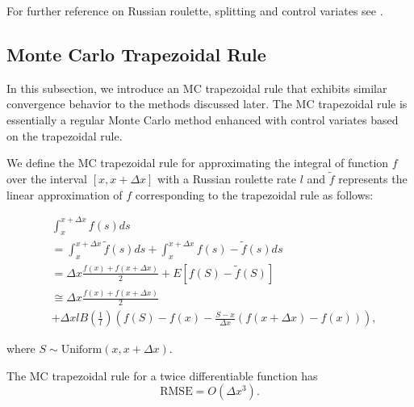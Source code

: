 \documentclass[a4paper,12pt]{article}
\begin{document}
\begin{related}[MC modification]
    For further reference on Russian roulette, splitting and control variates
    see \cite{veach_robust_1997}.
\end{related}

\subsection{Monte Carlo Trapezoidal Rule}

In this subsection, we introduce an MC trapezoidal rule that
exhibits similar convergence behavior to the methods discussed later.
The MC trapezoidal rule is essentially a regular Monte Carlo method
enhanced with control variates based on the trapezoidal rule.

\begin{definition}
    We define the MC trapezoidal rule for approximating the integral
    of function $f$ over the interval $[x, x+\Delta x]$ with a Russian roulette rate
    $l$ and $\tilde{f}$ represents the linear approximation of $f$ corresponding
    to the trapezoidal rule as follows:

    \begin{align}
         & \int_{x}^{x+\Delta x} f(s) ds                           \\
         & = \int_{x}^{x+\Delta x}  \tilde{f}(s) ds +
        \int_{x}^{x+\Delta x}  f(s) - \tilde{f}(s) ds              \\
         & = \Delta x \frac{f(x) + f(x+\Delta x)}{2}
        + E \left[f(S) - \tilde{f}(S)\right]                       \\
         & \cong \Delta x \frac{f(x) + f(x+\Delta x)}{2} \nonumber \\
         & + \Delta x l B\left( \frac{1}{l}\right)
        \left(f(S) - f(x) - \frac{S - x}{\Delta x}
        \left(f(x+\Delta x) - f(x)\right) \right), \label{eq:MCtrap}
    \end{align}

    where $S \sim \text{Uniform}(x,x+\Delta x)$.
\end{definition}

\begin{lemma} \label{lem:rmse mctrap}
    The MC trapezoidal rule
    for a twice differentiable function has
    \begin{equation}
        \text{RMSE} =O\left( \Delta x^{3} \right) .
    \end{equation}
\end{lemma}
\end{document}

